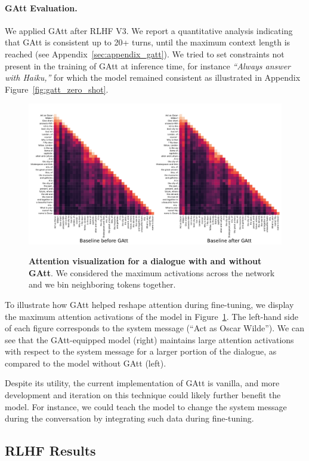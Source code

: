 \documentclass{article}
\begin{document}
\paragraph{GAtt Evaluation.} We applied GAtt after RLHF V3. We report a quantitative analysis indicating that GAtt is consistent up to 20+ turns, until the maximum context length is reached (see Appendix~\ref{sec:appendix_gatt}). We tried to set constraints not present in the training of GAtt at inference time, for instance \textit{``Always answer with Haiku,''} for which the model remained consistent as illustrated in Appendix Figure~\ref{fig:gatt_zero_shot}. 

\begin{figure}[ht]
\centering 
{\includegraphics[width=0.8 \linewidth]{img/attn_viz_wilde.pdf}}
\caption{\textbf{Attention visualization for a dialogue with and without GAtt}. We considered the maximum activations across the network and we bin neighboring tokens together.}
\label{fig:attn_viz_doc}
\end{figure}

To illustrate how GAtt helped reshape attention during fine-tuning, we display the maximum attention activations of the model in Figure~\ref{fig:attn_viz_doc}. The left-hand side of each figure corresponds to the system message (``Act as Oscar Wilde'').
We can see that the GAtt-equipped model (right) maintains large attention activations with respect to the system message for a larger portion of the dialogue, as compared to the model without GAtt (left).


Despite its utility, the current implementation of GAtt is vanilla, and more development and iteration on this technique could likely further benefit the model. For instance, we could teach the model to change the system message during the conversation by integrating such data during fine-tuning.

\subsection{RLHF Results}
\end{document}

